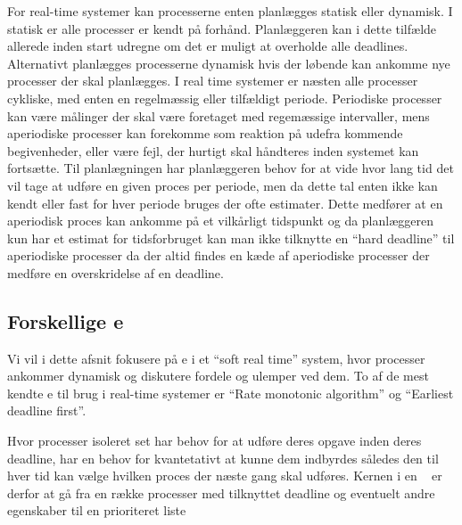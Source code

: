 For real-time systemer kan processerne enten planlægges statisk eller dynamisk\cite{cheng1987scheduling}. I statisk er alle processer er kendt på forhånd. Planlæggeren kan i dette tilfælde allerede inden start udregne om det er muligt at overholde alle deadlines. Alternativt planlægges processerne dynamisk hvis der  løbende kan ankomme nye  processer der skal planlægges. I real time systemer er næsten alle processer cykliske, med enten en regelmæssig eller tilfældigt periode. Periodiske processer kan være målinger der skal være foretaget med regemæssige intervaller, mens aperiodiske processer kan forekomme som reaktion på udefra kommende begivenheder, eller være fejl, der hurtigt skal håndteres inden systemet kan fortsætte.
Til planlægningen har planlæggeren behov for at vide hvor lang tid det vil tage at udføre en given proces per periode, men da dette tal enten ikke kan kendt eller fast for hver periode bruges der ofte estimater. Dette medfører at en aperiodisk proces kan ankomme på et vilkårligt tidspunkt og da planlæggeren kun har et estimat for tidsforbruget kan man  ikke tilknytte en ``hard deadline'' til aperiodiske processer da der altid findes en kæde af aperiodiske processer der medføre en overskridelse af en deadline. 

\subsection{Forskellige \sched e}
Vi vil i dette afsnit fokusere på \sched e i et ``soft real time'' system,   hvor processer ankommer dynamisk og diskutere fordele og ulemper ved dem.
To af de mest kendte \sched e til brug i real-time systemer er ``Rate monotonic algorithm''\cite{lehoczky1989rate,liu1973scheduling} og ``Earliest deadline first''\cite{liu1973scheduling}.

Hvor processer isoleret set har behov for at udføre deres opgave inden deres deadline, har \sched en behov for kvantetativt at kunne  dem indbyrdes således den til hver tid kan vælge hvilken proces der næste gang skal udføres. Kernen i en  \sched ~ er derfor at gå fra en række processer med tilknyttet deadline og eventuelt andre egenskaber til en prioriteret liste 

